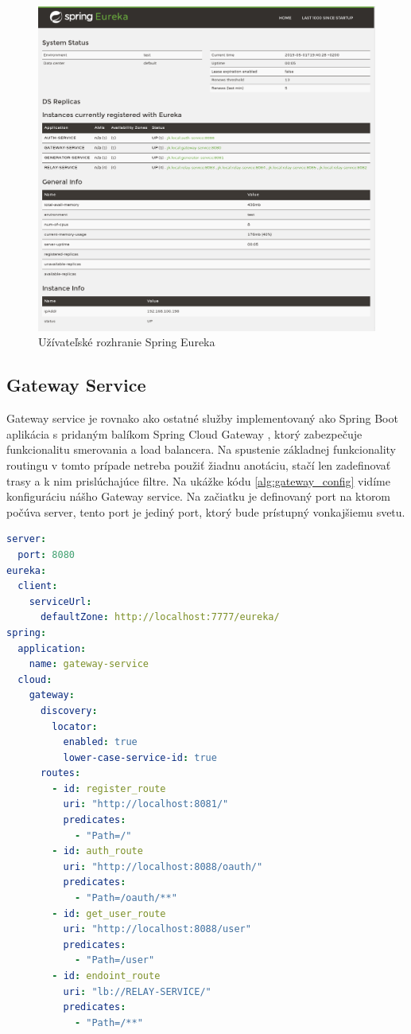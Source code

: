 \begin{figure}[!htbp]
	\centering
	\includegraphics[width=16cm]{img/eureka_gui.png}
	\caption{Užívateľské rozhranie Spring Eureka}
	\label{eureka_gui}
\end{figure}

\subsection{Gateway Service}
Gateway service je rovnako ako ostatné služby implementovaný ako Spring Boot aplikácia s pridaným balíkom Spring Cloud Gateway \cite{cloud_gateway}, ktorý zabezpečuje funkcionalitu smerovania a load balancera.
Na spustenie základnej funkcionality routingu v tomto prípade netreba použiť žiadnu anotáciu, stačí len zadefinovať trasy a k nim prislúchajúce filtre. Na ukážke kódu \ref{alg:gateway_config} vidíme konfiguráciu nášho Gateway service. Na začiatku je definovaný port na ktorom počúva server, tento port je jediný port, ktorý bude prístupný vonkajšiemu svetu.

\begin{lstlisting}[float, caption={Konfigurácia Gateway service},label={alg:gateway_config},language=yaml]
server:
  port: 8080
eureka:
  client:
    serviceUrl:
      defaultZone: http://localhost:7777/eureka/
spring:
  application:
    name: gateway-service
  cloud:
    gateway:
      discovery:
        locator:
          enabled: true
          lower-case-service-id: true
      routes:
        - id: register_route
          uri: "http://localhost:8081/"
          predicates:
            - "Path=/"
        - id: auth_route
          uri: "http://localhost:8088/oauth/"
          predicates:
            - "Path=/oauth/**"
        - id: get_user_route
          uri: "http://localhost:8088/user"
          predicates:
            - "Path=/user"
        - id: endoint_route
          uri: "lb://RELAY-SERVICE/"
          predicates:
            - "Path=/**"
\end{lstlisting}

